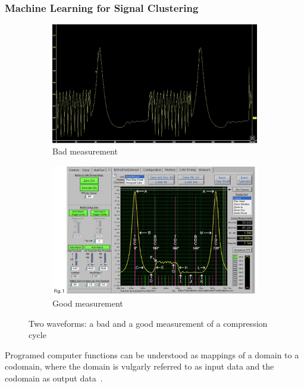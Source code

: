 \subsubsection{Machine Learning for Signal Clustering}
\begin{figure}[ht]
  \centering
  
  \begin{subfigure}[b]{0.48\linewidth}
    \includegraphics[width=\linewidth]{figures/bad.png}
    \caption{Bad measurement}
  \end{subfigure}
  \hfill
  \begin{subfigure}[b]{0.48\linewidth}
    \includegraphics[width=\linewidth]{figures/good.jpeg}
    \caption{Good measurement}
  \end{subfigure}

  \caption{Two waveforms: a bad and a good measurement of a compression cycle}
  \label{fig:waveforms_good_bad}
\end{figure}
Programed computer functions can be understood as mappings of a domain to a codomain, where the domain is vulgarly referred to as input data and the codomain as output data~\cite{knuth71, wirth76}. 
